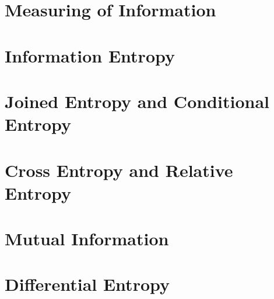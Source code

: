 \chapterspaceabove{6.75cm} 
\chapterspacebelow{7.25cm} 
\chapter{Measuring of Information}


\chapterspaceabove{6.75cm} 
\chapterspacebelow{7.25cm} 
\chapter{Information Entropy}


\chapterspaceabove{6.75cm} 
\chapterspacebelow{7.25cm} 
\chapter{Joined Entropy and Conditional Entropy}


\chapterspaceabove{6.75cm} 
\chapterspacebelow{7.25cm} 
\chapter{Cross Entropy and Relative Entropy}


\chapterspaceabove{6.75cm} 
\chapterspacebelow{7.25cm} 
\chapter{Mutual Information}


\chapterspaceabove{6.75cm} 
\chapterspacebelow{7.25cm} 
\chapter{Differential Entropy}
